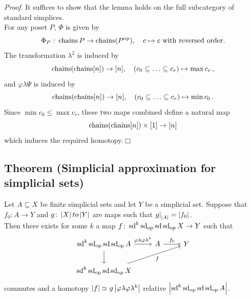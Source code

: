         \emph{Proof}. It suffices to show that the lemma holds on the full subcategory of standard simplices.\\
        For any poset $P$, $\Phi$ is given by
        \begin{equation*}
            \Phi_P \,\colon \operatorname{chains} P \to \operatorname{chains}(P^{\operatorname{op}}), \quad c \mapsto c \text{ with reversed order}.
        \end{equation*}
        The transformation $\lambda^2$ is induced by
        \begin{equation*}
            \operatorname{chains}(\operatorname{chains}[n]) \to [n], \quad (c_0 \subseteq \ldots \subseteq c_r) \mapsto \max c_r \,,
        \end{equation*}
        and $\varphi \lambda \Psi$ is induced by
        \begin{equation*}
            \operatorname{chains}(\operatorname{chains}[n]) \to [n], \quad (c_0 \subseteq \ldots \subseteq c_r) \mapsto \min c_0 \,.
        \end{equation*}
        Since $\min c_0 \leq \max c_r$, these two maps combined define a natural map
        \begin{equation*}
            \operatorname{chains}(\operatorname{chains}[n]) \times [1] \to [n]
        \end{equation*}
        which induces the required homotopy.\hfill$\Box$

    \subsection{Theorem (Simplicial approximation for simplicial sets)}\label{chV-5-21}
        Let $A \subseteq X$ be finite simplicial sets and let $Y$ be a simplicial set. Suppose that $f_0 \colon A \to Y$ and $g \colon \left| X \right| to \left| Y \right|$ are maps such that ${g|}_{\left| A \right|} = \left| f_0 \right|$.\\
        Then there exists for some $k$ a map $f \colon \operatorname{sd}^k \operatorname{sd}_{\operatorname{op}} \operatorname{sd} \operatorname{sd}_{\operatorname{op}} X \to Y$ such that
        \begin{equation*}
            \begin{tikzcd}
                \sd^k \sd_{\op} \sd \sd_{\op} A \arrow[d] \arrow[r, "\varphi \lambda \varphi \lambda^k"] & A \arrow[r, "f_0"] & Y \\
                \sd^k \sd_{\op} \sd \sd_{\op} X \arrow[urr, "f"']
            \end{tikzcd}
        \end{equation*}
        commutes and a homotopy $\left| f \right| \simeq g \left| \varphi \lambda \varphi \lambda^k \right|$ relative $\left| \operatorname{sd}^k \operatorname{sd}_{\operatorname{op}} \operatorname{sd} \operatorname{sd}_{\operatorname{op}} A \right|$.
        \smallskip

